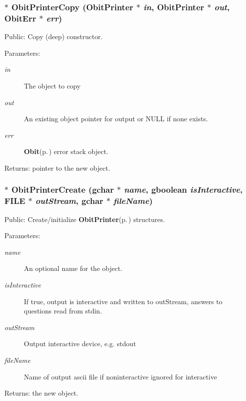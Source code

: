 \subsubsection{$\ast$ Obit\-Printer\-Copy ({\bf Obit\-Printer} $\ast$ {\em in}, {\bf Obit\-Printer} $\ast$ {\em out}, {\bf Obit\-Err} $\ast$ {\em err})}\label{ObitPrinter_8c_a8}


Public: Copy (deep) constructor. 

\begin{Desc}
\item[Parameters:]
\begin{description}
\item[{\em in}]The object to copy \item[{\em out}]An existing object pointer for output or NULL if none exists. \item[{\em err}]{\bf Obit}{\rm (p.\,\pageref{structObit})} error stack object. \end{description}
\end{Desc}
\begin{Desc}
\item[Returns:]pointer to the new object. \end{Desc}
\subsubsection{$\ast$ Obit\-Printer\-Create (gchar $\ast$ {\em name}, gboolean {\em is\-Interactive}, FILE $\ast$ {\em out\-Stream}, gchar $\ast$ {\em file\-Name})}\label{ObitPrinter_8c_a10}


Public: Create/initialize {\bf Obit\-Printer}{\rm (p.\,\pageref{structObitPrinter})} structures. 

\begin{Desc}
\item[Parameters:]
\begin{description}
\item[{\em name}]An optional name for the object. \item[{\em is\-Interactive}]If true, output is interactive and written to out\-Stream, answers to questions read from stdin. \item[{\em out\-Stream}]Output interactive device, e.g. stdout \item[{\em file\-Name}]Name of output ascii file if noninteractive ignored for interactive \end{description}
\end{Desc}
\begin{Desc}
\item[Returns:]the new object. \end{Desc}
